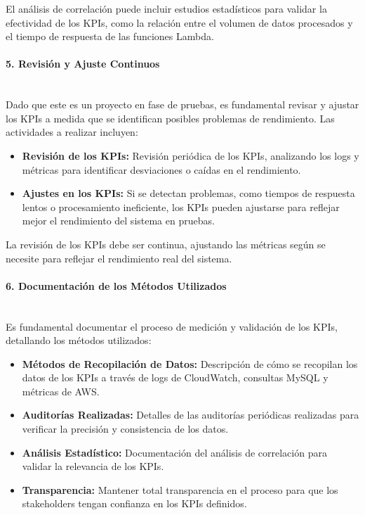 \documentclass{article}
\begin{document}
El análisis de correlación puede incluir estudios estadísticos para validar la efectividad de los KPIs, como la relación entre el volumen de datos procesados y el tiempo de respuesta de las funciones Lambda.

\paragraph{5. Revisión y Ajuste Continuos} \mbox{} \\
Dado que este es un proyecto en fase de pruebas, es fundamental revisar y ajustar los KPIs a medida que se identifican posibles problemas de rendimiento. Las actividades a realizar incluyen:

\begin{itemize}
    \item \textbf{Revisión de los KPIs:} Revisión periódica de los KPIs, analizando los logs y métricas para identificar desviaciones o caídas en el rendimiento.
    \item \textbf{Ajustes en los KPIs:} Si se detectan problemas, como tiempos de respuesta lentos o procesamiento ineficiente, los KPIs pueden ajustarse para reflejar mejor el rendimiento del sistema en pruebas.
\end{itemize}

La revisión de los KPIs debe ser continua, ajustando las métricas según se necesite para reflejar el rendimiento real del sistema.

\paragraph{6. Documentación de los Métodos Utilizados} \mbox{} \\
Es fundamental documentar el proceso de medición y validación de los KPIs, detallando los métodos utilizados:

\begin{itemize}
    \item \textbf{Métodos de Recopilación de Datos:} Descripción de cómo se recopilan los datos de los KPIs a través de logs de CloudWatch, consultas MySQL y métricas de AWS.
    \item \textbf{Auditorías Realizadas:} Detalles de las auditorías periódicas realizadas para verificar la precisión y consistencia de los datos.
    \item \textbf{Análisis Estadístico:} Documentación del análisis de correlación para validar la relevancia de los KPIs.
    \item \textbf{Transparencia:} Mantener total transparencia en el proceso para que los stakeholders tengan confianza en los KPIs definidos.
\end{itemize}
\end{document}

